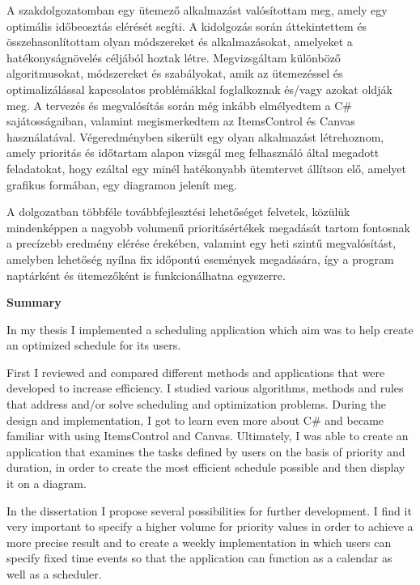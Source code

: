 
A szakdolgozatomban egy ütemező alkalmazást valósítottam meg, amely egy optimális időbeosztás elérését segíti. A kidolgozás során áttekintettem és összehasonlítottam olyan módszereket és alkalmazásokat, amelyeket a hatékonyságnövelés céljából hoztak létre. Megvizsgáltam különböző algoritmusokat, módszereket és szabályokat, amik az ütemezéssel és optimalizálással kapcsolatos problémákkal foglalkoznak és/vagy azokat oldják meg. A tervezés és megvalósítás során még inkább elmélyedtem a C\# sajátosságaiban, valamint megismerkedtem az ItemsControl és Canvas használatával. Végeredményben sikerült egy olyan alkalmazást létrehoznom, amely prioritás és időtartam alapon vizsgál meg felhasználó által megadott feladatokat, hogy ezáltal egy minél hatékonyabb ütemtervet állítson elő, amelyet grafikus formában, egy diagramon jelenít meg.

A dolgozatban többféle továbbfejlesztési lehetőséget felvetek, közülük mindenképpen a nagyobb volumenű prioritásértékek megadását tartom fontosnak a precízebb eredmény elérése érekében, valamint egy heti szintű megvalósítást, amelyben lehetőség nyílna fix időpontú események megadására, így a program naptárként és ütemezőként is funkcionálhatna egyszerre.

\newpage
\begin{LARGE}
\textbf{Summary}
\end{LARGE}
\vskip 1cm

In my thesis I implemented a scheduling application which aim was to help create an optimized schedule for its users.

First I reviewed and compared different methods and applications that were developed to increase efficiency. I studied various algorithms, methods and rules that address and/or solve scheduling and optimization problems. During the design and implementation, I got to learn even more about C\# and became familiar with using ItemsControl and Canvas. Ultimately, I was able to create an application that examines the tasks defined by users on the basis of priority and duration, in order to create the most efficient schedule possible and then display it on a diagram.

In the dissertation I propose several possibilities for further development. I find it very important to specify a higher volume for priority values in order to achieve a more precise result and to create a weekly implementation in which users can specify fixed time events so that the application can function as a calendar as well as a scheduler.
